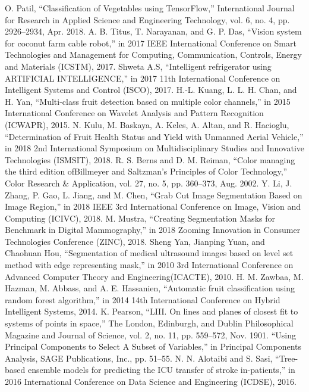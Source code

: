 \documentclass[conference]{IEEEtran}
\begin{document}
\begin{thebibliography}{00}
		 O. Patil, ``Classification of Vegetables using TensorFlow,'' International Journal for Research in Applied Science and Engineering Technology, vol. 6, no. 4, pp. 2926–2934, Apr. 2018.
		 A. B. Titus, T. Narayanan, and G. P. Das, ``Vision system for coconut farm cable robot,'' in 2017 IEEE International Conference on Smart Technologies and Management for Computing, Communication, Controls, Energy and Materials (ICSTM), 2017.
		 Shweta A.S, ``Intelligent refrigerator using ARTIFICIAL INTELLIGENCE,'' in 2017 11th International Conference on Intelligent Systems and Control (ISCO), 2017.
		 H.-L. Kuang, L. L. H. Chan, and H. Yan, ``Multi-class fruit detection based on multiple color channels,'' in 2015 International Conference on Wavelet Analysis and Pattern Recognition (ICWAPR), 2015.
		 N. Kulu, M. Baskaya, A. Keles, A. Altan, and R. Hacioglu, ``Determination of Fruit Health Status and Yield with Unmanned Aerial Vehicle,'' in 2018 2nd International Symposium on Multidisciplinary Studies and Innovative Technologies (ISMSIT), 2018.
		 R. S. Berns and D. M. Reiman, ``Color managing the third edition ofBillmeyer and Saltzman’s Principles of Color Technology,'' Color Research \& Application, vol. 27, no. 5, pp. 360–373, Aug. 2002.
		 Y. Li, J. Zhang, P. Gao, L. Jiang, and M. Chen, ``Grab Cut Image Segmentation Based on Image Region,'' in 2018 IEEE 3rd International Conference on Image, Vision and Computing (ICIVC), 2018.
		 M. Mustra, ``Creating Segmentation Masks for Benchmark in Digital Mammography,'' in 2018 Zooming Innovation in Consumer Technologies Conference (ZINC), 2018.
		 Sheng Yan, Jianping Yuan, and Chaohuan Hou, ``Segmentation of medical ultrasound images based on level set method with edge representing mask,'' in 2010 3rd International Conference on Advanced Computer Theory and Engineering(ICACTE), 2010.
		 H. M. Zawbaa, M. Hazman, M. Abbass, and A. E. Hassanien, ``Automatic fruit classification using random forest algorithm,'' in 2014 14th International Conference on Hybrid Intelligent Systems, 2014.
		 K. Pearson, ``LIII. On lines and planes of closest fit to systems of points in space,'' The London, Edinburgh, and Dublin Philosophical Magazine and Journal of Science, vol. 2, no. 11, pp. 559–572, Nov. 1901.
		 ``Using Principal Components to Select A Subset of Variables,'' in Principal Components Analysis, SAGE Publications, Inc., pp. 51–55.
		 N. N. Alotaibi and S. Sasi, ``Tree-based ensemble models for predicting the ICU transfer of stroke in-patients,'' in 2016 International Conference on Data Science and Engineering (ICDSE), 2016.

\end{thebibliography}
\end{document}
